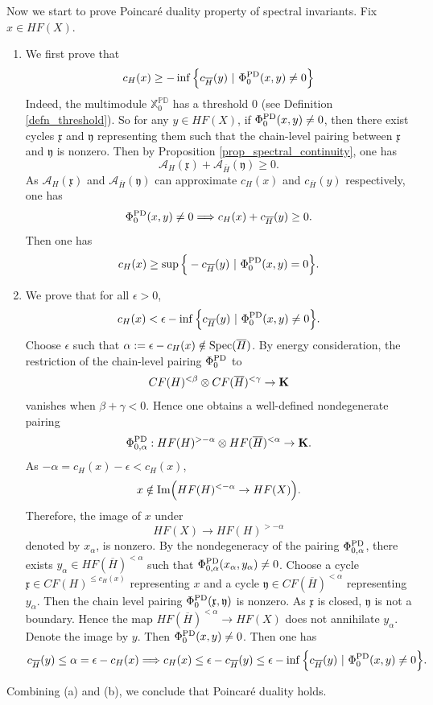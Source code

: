 \documentclass[reqno, 10pt]{amsart}
\numberwithin{equation}{section}
\numberwithin{equation}{section}
\theoremstyle{definition}
\theoremstyle{remark}
\newcommand{\beqn}{\begin{equation*}}
\newcommand{\eeqn}{\end{equation*}}
\newcommand{\ov}{\overline}
\newcommand{\mb}{\mathbb}
\newcommand{\mc}{\mathcal}
\newcommand{\mf}{\mathfrak}
\begin{document}
\begin{enumerate}
Now we start to prove Poincar\'e duality property of spectral invariants. Fix $x \in HF(X)$. 
\begin{enumerate}

    \item We first prove that 
    \beqn
    c_H(x) \geq - \inf \Big\{ c_{\ov{H}}(y)\ |\ \Phi_0^{\rm PD}(x,y) \neq 0 \Big\}
    \eeqn
    Indeed, the multimodule ${\mb X}_0^{\mb{PD}}$ has a threshold $0$ (see Definition \ref{defn_threshold}). So for any $y \in HF(X)$, if $\Phi_0^{\rm PD}(x,y) \neq 0$, then there exist cycles ${\mf x}$ and ${\mf y}$ representing them such that the chain-level pairing between ${\mf x}$ and ${\mf y}$ is nonzero. Then by Proposition \ref{prop_spectral_continuity}, one has
    \beqn
    {\mc A}_H({\mf x}) + {\mc A}_{\ov{H}}({\mf y}) \geq 0.
    \eeqn
    As ${\mc A}_H({\mf x})$ and ${\mc A}_{\ov{H}}({\mf y})$ can approximate $c_H(x)$ and $c_{\ov{H}}(y)$ respectively, one has
\beqn
\Phi_0^{\rm PD}(x,y) \neq 0 \Longrightarrow c_H(x) + c_{\ov{H}} (y) \geq 0.
\eeqn
Then  one has 
\beqn
c_H(x) \geq \sup \Big\{ - c_{\ov{H}}(y)\ |\ \Phi_0^{\rm PD}(x,y) = 0 \Big\}.
\eeqn

\item We prove that for all $\epsilon>0$,
\beqn
c_H(x) < \epsilon - \inf \Big\{ c_{\ov{H}}(y)\ |\ \Phi_0^{\rm PD}(x,y) \neq 0 \Big\}.
\eeqn
Choose $\epsilon$ such that $\alpha:= \epsilon - c_H(x) \notin {\rm Spec}(\ov{H})$. By energy consideration, the restriction of the chain-level pairing $\Phi_0^{\rm PD}$ to 
\beqn
CF(H)^{<\beta} \otimes CF(\ov{H})^{<\gamma} \to {\bf K}
\eeqn
vanishes when $\beta + \gamma < 0$. Hence one obtains a well-defined nondegenerate pairing
\beqn
\Phi_{0,\alpha}^{\rm PD}: HF(H)^{>-\alpha} \otimes HF(\ov{H})^{<\alpha} \to {\bf K}.
\eeqn 
As $-\alpha = c_H(x) - \epsilon < c_H(x)$, 
\beqn
x \notin {\rm Im} \Big( HF(H)^{<-\alpha} \to HF(X) \Big).
\eeqn
Therefore, the image of $x$ under
\beqn
HF(X) \to HF(H)^{>-\alpha}
\eeqn
denoted by $x_\alpha$, is nonzero. By the nondegeneracy of the pairing $\Phi_{0, \alpha}^{\rm PD}$, there exists $y_\alpha \in HF(\ov{H})^{<\alpha}$ such that $\Phi_{0,\alpha}^{\rm PD}(x_\alpha, y_\alpha) \neq 0$. Choose a cycle ${\mf x} \in CF(H)^{\leq c_H(x)}$ representing $x$ and a cycle ${\mf y} \in CF(\ov{H})^{<\alpha}$ representing $y_\alpha$. Then the chain level pairing $\Phi_0^{\rm PD}({\mf x}, {\mf y})$ is nonzero. As ${\mf x}$ is closed, ${\mf y}$ is not a boundary. Hence the map $HF(\ov{H})^{<\alpha} \to HF(X)$ does not annihilate $y_\alpha$. Denote the image by $y$. Then $\Phi_0^{\rm PD}(x,y) \neq 0$. Then one has 
\beqn
c_{\ov{H}}(y) \leq \alpha = \epsilon - c_H(x)\Longrightarrow c_H(x) \leq \epsilon - c_{\ov{H}}(y) \leq \epsilon - \inf \Big\{ c_{\ov{H}}(y)\ |\ \Phi_0^{\rm PD}(x,y) \neq 0 \Big\}.
\eeqn    
\end{enumerate}

Combining (a) and (b), we conclude that Poincar\'e duality holds.

\end{enumerate}
\end{document}
